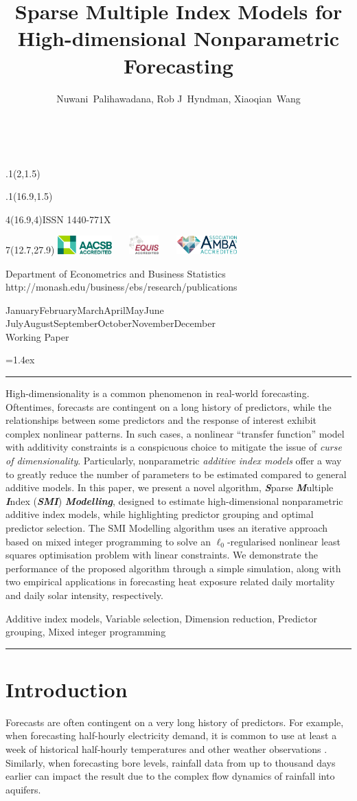 \documentclass[11pt,a4paper,]{article}
\title{Sparse Multiple Index Models for High-dimensional Nonparametric
Forecasting}
\author{Nuwani~Palihawadana, Rob J~Hyndman, Xiaoqian~Wang}
\date{\sf\Date~\Month~\Year}
\makeatletter
\def\Date{\number\day}
\def\Month{\ifcase\month\or
 January\or February\or March\or April\or May\or June\or
 July\or August\or September\or October\or November\or December\fi}
\def\Year{\number\year}
\def\showjel{{\large\textsf{\textbf{JEL classification:}}~\@jel}}
\def\cover{{\sffamily\setcounter{page}{0}
        \thispagestyle{empty}
        \placefig{2}{1.5}{width=5cm}{_extensions/numbats/wp/monash2}
        \placefig{16.9}{1.5}{width=2.1cm}{_extensions/numbats/wp/MBSportrait}
        \begin{textblock}{4}(16.9,4)ISSN 1440-771X\end{textblock}
        \begin{textblock}{7}(12.7,27.9)\hfill
        \includegraphics[height=0.7cm]{_extensions/numbats/wp/AACSB}~~~
        \includegraphics[height=0.7cm]{_extensions/numbats/wp/EQUIS}~~~
        \includegraphics[height=0.7cm]{_extensions/numbats/wp/AMBA}
        \end{textblock}
        \vspace*{2cm}
        \begin{center}\Large
        Department of Econometrics and Business Statistics\\[.5cm]
        \footnotesize http://monash.edu/business/ebs/research/publications
        \end{center}\vspace{2cm}
        \begin{center}
        \fbox{\parbox{14cm}{\begin{onehalfspace}\centering\Huge\vspace*{0.3cm}
                \textsf{\textbf{\expandafter{\@title}}}\vspace{1cm}\par
                \LARGE\@author\end{onehalfspace}
        }}
        \end{center}
        \vfill
                \begin{center}\Large
                \Month~\Year\\[1cm]
                Working Paper \@wp
        \end{center}\vspace*{2cm}}}
\def\pageone{{\sffamily\setstretch{1}%
        \thispagestyle{empty}%
        \vbox to \textheight{%
        \raggedright\baselineskip=1.2cm
     {\fontsize{24.88}{30}\sffamily\textbf{\expandafter{\@title}}}
        \vspace{2cm}\par
        \hspace{1cm}\parbox{14cm}{\sffamily\large\@addresses}\vspace{1cm}\vfill
        \hspace{1cm}{\large\Date~\Month~\Year}\\[1cm]
        \hspace{1cm}\showjel\vss}}}
\def\blindtitle{{\sffamily
     \thispagestyle{plain}\raggedright\baselineskip=1.2cm
     {\fontsize{24.88}{30}\sffamily\textbf{\expandafter{\@title}}}\vspace{1cm}\par
        }}
\def\titlepage{{\cover\newpage\pageone\newpage\blindtitle}}
\let\maketitle\titlepage
\newenvironment{keywords}{\par\vspace{0.5cm}\noindent{\sffamily\textbf{Keywords:}}}{\vspace{0.25cm}\par\hrule\vspace{0.5cm}\par}
\renewenvironment{abstract}{\begin{minipage}{\textwidth}\parskip=1.4ex\noindent
\hrule\vspace{0.1cm}\par{\sffamily\textbf{\abstractname}}\newline}
  {\end{minipage}}
\def\placefig#1#2#3#4{\begin{textblock}{.1}(#1,#2)\rlap{\texttt{[image: \#4]}}\end{textblock}}
\makeatother
\begin{document}
\maketitle
\begin{abstract}
High-dimensionality is a common phenomenon in real-world forecasting.
Oftentimes, forecasts are contingent on a long history of predictors,
while the relationships between some predictors and the response of
interest exhibit complex nonlinear patterns. In such cases, a nonlinear
``transfer function'' model with additivity constraints is a conspicuous
choice to mitigate the issue of \emph{curse of dimensionality}.
Particularly, nonparametric \emph{additive index models} offer a way to
greatly reduce the number of parameters to be estimated compared to
general additive models. In this paper, we present a novel algorithm,
\textbf{\emph{S}}parse \textbf{\emph{M}}ultiple \textbf{\emph{I}}ndex
(\textbf{\emph{SMI}}) \textbf{\emph{Modelling}}, designed to estimate
high-dimensional nonparametric additive index models, while highlighting
predictor grouping and optimal predictor selection. The SMI Modelling
algorithm uses an iterative approach based on mixed integer programming
to solve an \(\ell_{0}\)-regularised nonlinear least squares
optimisation problem with linear constraints. We demonstrate the
performance of the proposed algorithm through a simple simulation, along
with two empirical applications in forecasting heat exposure related
daily mortality and daily solar intensity, respectively.
\end{abstract}
\begin{keywords}
Additive index models, Variable selection, Dimension reduction,
Predictor grouping, Mixed integer programming
\end{keywords}

\ifdefined\Shaded\renewenvironment{Shaded}{\begin{tcolorbox}[interior hidden, frame hidden, boxrule=0pt, borderline west={3pt}{0pt}{shadecolor}, sharp corners, breakable, enhanced]}{\end{tcolorbox}}\fi

\hypertarget{sec-introduction}{%
\section{Introduction}\label{sec-introduction}}

Forecasts are often contingent on a very long history of predictors. For
example, when forecasting half-hourly electricity demand, it is common
to use at least a week of historical half-hourly temperatures and other
weather observations \autocite{HF2010}. Similarly, when forecasting bore
levels, rainfall data from up to thousand days earlier can impact the
result \autocite{Bakker2019} due to the complex flow dynamics of
rainfall into aquifers.
\end{document}
